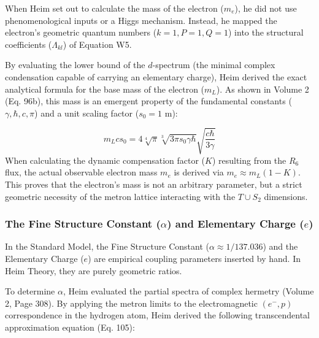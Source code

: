 \documentclass[11pt,a4paper,oneside]{article}
\begin{document}
When Heim set out to calculate the mass of the electron ($m_e$), he did not use phenomenological inputs or a Higgs mechanism. Instead, he mapped the electron's geometric quantum numbers ($k=1, P=1, Q=1$) into the structural coefficients ($\Lambda_{kl}$) of Equation W5. 

By evaluating the lower bound of the $d$-spectrum (the minimal complex condensation capable of carrying an elementary charge), Heim derived the exact analytical formula for the base mass of the electron ($m_L$). As shown in Volume 2 (Eq. 96b), this mass is an emergent property of the fundamental constants ($\gamma, \hbar, c, \pi$) and a unit scaling factor ($s_0 = 1$ m):

\begin{tcolorbox}[colback=white, colframe=theoryblue, title=\textbf{Geometric Electron Mass Equation (Eq. 96b)}]
\begin{equation}
    m_L c s_0 = 4 \sqrt[4]{\pi} \sqrt[3]{3\pi s_0 \gamma \hbar} \sqrt{\frac{c\hbar}{3\gamma}}
\end{equation}
When calculating the dynamic compensation factor ($K$) resulting from the $R_6$ flux, the actual observable electron mass $m_e$ is derived via $m_e \approx m_L(1 - K)$. This proves that the electron's mass is not an arbitrary parameter, but a strict geometric necessity of the metron lattice interacting with the $T \cup S_2$ dimensions.
\end{tcolorbox}

\subsubsection{The Fine Structure Constant ($\alpha$) and Elementary Charge ($e$)}
In the Standard Model, the Fine Structure Constant ($\alpha \approx 1/137.036$) and the Elementary Charge ($e$) are empirical coupling parameters inserted by hand. In Heim Theory, they are purely geometric ratios.

To determine $\alpha$, Heim evaluated the partial spectra of complex hermetry (Volume 2, Page 308). By applying the metron limits to the electromagnetic $(e^-, p)$ correspondence in the hydrogen atom, Heim derived the following transcendental approximation equation (Eq. 105):
\end{document}
